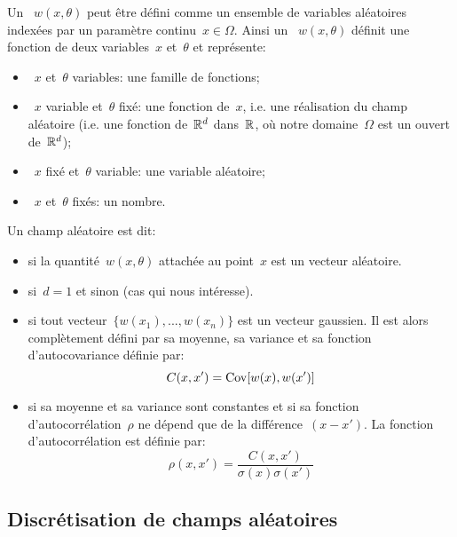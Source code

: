 \begin{definition}
Un ~$w(x,\theta)$ peut être défini comme un ensemble de variables aléatoires indexées par un paramètre continu~$x\in\Omega$.
Ainsi un ~$w(x,\theta)$ définit une fonction de deux variables~$x$ et~$\theta$ et représente:
\begin{itemize}
   \item~$x$ et~$\theta$ variables: une famille de fonctions;
   \item~$x$ variable et~$\theta$ fixé: une fonction de~$x$, i.e. une réalisation du champ aléatoire (i.e. une fonction de~$\mathbb R^d$ dans~$\mathbb R$, où notre domaine~$\Omega$ est un ouvert de~$\mathbb R^d$);
   \item~$x$ fixé et~$\theta$ variable: une variable aléatoire;
   \item~$x$ et~$\theta$ fixés: un nombre.
\end{itemize}
\end{definition}
Un champ aléatoire est dit:
\begin{itemize}
   \item {} si la quantité~$w(x,\theta)$ attachée au point~$x$ est un vecteur aléatoire.
   \item {} si~$d=1$ et  sinon (cas qui nous intéresse).
   \item {} si tout vecteur~$\{w(x_1), ..., w(x_n)\}$ est un vecteur gaussien. Il est alors complètement défini par sa moyenne, sa variance et sa fonction d'autocovariance définie par:
   \begin{equation}
       C(x,x')=\operatorname{Cov}[w(x),w(x')]
   \end{equation}
   \item {} si sa moyenne et sa variance sont constantes et si sa fonction d'autocorrélation~$\rho$ ne dépend que de la différence~$(x-x')$. La fonction d'autocorrélation est définie par: 
   \begin{equation}
      \rho(x,x')=\dfrac{C(x,x')}{\sigma(x)\sigma(x')}
   \end{equation}
\end{itemize}

\medskip
\subsection{Discrétisation de champs aléatoires}

